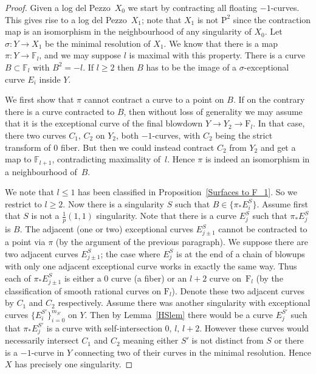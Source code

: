 \documentclass[12pt,a4paper]{book}      %
\theoremstyle{definition}
\newcommand{\ldp}{log del Pezzo}
\newcommand{\mb}[1]{\mathbb{#1}}
\newcommand{\F}{\mathrm{F}}
\renewcommand{\P}{\mathrm{P}}
\begin{document}
\begin{proof}
Given a \ldp\ $X_0$ we start by contracting all floating $-1$-curves. This gives rise to a \ldp\ $X_1$; note that $X_1$ is not $\P^2$ since the contraction map is an isomorphism in the neighbourhood of any singularity of $X_0$. Let $\sigma\colon Y\rightarrow X_1$ be the minimal resolution of $X_1$. We know that there is a map $\pi \colon Y \rightarrow \mathbb{F}_l$, and we may suppose $l$ is maximal with this property.
There is a curve $B \subset \mathbb{F}_l$ with $B^2 = -l$. 
If $l\ge2$ then $B$ has to be the image of a $\sigma$-exceptional curve $E_i$ inside $Y$.

We first show that $\pi$ cannot contract a curve to a point on $B$.
If on the contrary there is a curve contracted to $B$, then
without loss of generality we may assume that it is the exceptional curve of the final blowdown $Y\rightarrow Y_2\rightarrow\F_l$. In that case, there two curves $C_1, \, C_2$ on $Y_2$, both $-1$-curves, with $C_2$ being the strict transform of $0$ fiber. But then we could instead contract $C_2$ from $Y_2$ and get a map to $\mb{F}_{l+1}$, contradicting maximality of~$l$. 
Hence $\pi$ is indeed an isomorphism in a neighbourhood of~$B$.


We note that  $l \leq 1$ has been classified in Proposition~\ref{Surfaces to F_1}. So we restrict to $l \geq 2$. Now there is a singularity $S$ such that $B \in \{ \pi_*E_i^S \}$. Assume first that $S$ is not a $\frac{1}{p}(1,1)$ singularity. Note that there is a curve $E_j^S$ such that $\pi_* E_j^S$ is $B$. The adjacent (one or two) exceptional curves $E_{j\pm1}^S$ cannot be contracted to a point via $\pi$ (by the argument of the previous paragraph). We suppose there are two adjacent curves $E_{j\pm 1}^S$; the case where $E_j^S$ is at the end of a chain of blowups with only one adjacent exceptional curve works in exactly the same way. Thus each of $\pi_*E_{j\pm 1}^S$ is either a $0$ curve (a fiber) or an $l+2$ curve on~$\F_l$ (by the classification of smooth rational curves on $\F_l$).
Denote these two adjacent curves by $C_1$ and $C_2$ respectively. Assume there was another singularity with exceptional curves $\{ E_i^{S'} \}_{i=0}^{m_{S'}} $ on $Y$. Then by Lemma~\ref{HSlem} there would be a curve $E_j^{S'}$ such that $\pi_* E_j^{S'}$ is a curve with self-intersection $0, \,  l,\,  l+2$. However these curves would necessarily intersect $C_1$ and $C_2$ meaning either $S'$ is not distinct from $S$ or there is a $-1$-curve in $Y$ connecting two of their curves in the minimal resolution. Hence $X$ has precisely one singularity. 


\end{proof}
\end{document}
